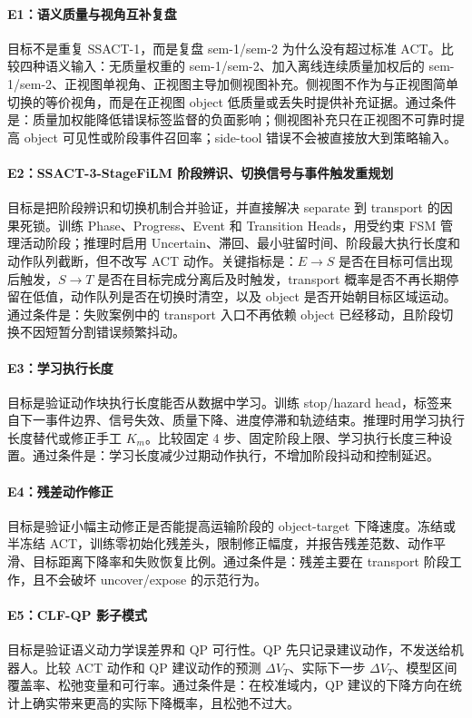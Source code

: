 \documentclass[UTF8,a4paper,11pt]{ctexart}
\begin{document}
\paragraph{E1：语义质量与视角互补复盘}
目标不是重复 SSACT-1，而是复盘 sem-1/sem-2 为什么没有超过标准 ACT。比较四种语义输入：无质量权重的 sem-1/sem-2、加入离线连续质量加权后的 sem-1/sem-2、正视图单视角、正视图主导加侧视图补充。侧视图不作为与正视图简单切换的等价视角，而是在正视图 object 低质量或丢失时提供补充证据。通过条件是：质量加权能降低错误标签监督的负面影响；侧视图补充只在正视图不可靠时提高 object 可见性或阶段事件召回率；side-tool 错误不会被直接放大到策略输入。

\paragraph{E2：SSACT-3-StageFiLM 阶段辨识、切换信号与事件触发重规划}
目标是把阶段辨识和切换机制合并验证，并直接解决 separate 到 transport 的因果死锁。训练 Phase、Progress、Event 和 Transition Heads，用受约束 FSM 管理活动阶段；推理时启用 Uncertain、滞回、最小驻留时间、阶段最大执行长度和动作队列截断，但不改写 ACT 动作。关键指标是：$E\rightarrow S$ 是否在目标可信出现后触发，$S\rightarrow T$ 是否在目标完成分离后及时触发，transport 概率是否不再长期停留在低值，动作队列是否在切换时清空，以及 object 是否开始朝目标区域运动。通过条件是：失败案例中的 transport 入口不再依赖 object 已经移动，且阶段切换不因短暂分割错误频繁抖动。

\paragraph{E3：学习执行长度}
目标是验证动作块执行长度能否从数据中学习。训练 stop/hazard head，标签来自下一事件边界、信号失效、质量下降、进度停滞和轨迹结束。推理时用学习执行长度替代或修正手工 $K_m$。比较固定 4 步、固定阶段上限、学习执行长度三种设置。通过条件是：学习长度减少过期动作执行，不增加阶段抖动和控制延迟。

\paragraph{E4：残差动作修正}
目标是验证小幅主动修正是否能提高运输阶段的 object-target 下降速度。冻结或半冻结 ACT，训练零初始化残差头，限制修正幅度，并报告残差范数、动作平滑、目标距离下降率和失败恢复比例。通过条件是：残差主要在 transport 阶段工作，且不会破坏 uncover/expose 的示范行为。

\paragraph{E5：CLF-QP 影子模式}
目标是验证语义动力学误差界和 QP 可行性。QP 先只记录建议动作，不发送给机器人。比较 ACT 动作和 QP 建议动作的预测 $\Delta V_T$、实际下一步 $\Delta V_T$、模型区间覆盖率、松弛变量和可行率。通过条件是：在校准域内，QP 建议的下降方向在统计上确实带来更高的实际下降概率，且松弛不过大。
\end{document}
